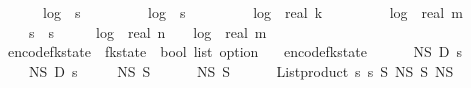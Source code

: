 \begin{isabellebody}
\ \ \ \ {}\ {\isacharasterisk}{\kern0pt}\ log\ {}\ {\isacharparenleft}{\kern0pt}s\ {\isacharplus}{\kern0pt}\ {}{\isacharparenright}{\kern0pt}\ {\isacharplus}{\kern0pt}\isanewline
\ \ \ \ {}\ {\isacharasterisk}{\kern0pt}\ log\ {}\ {\isacharparenleft}{\kern0pt}s\ {\isacharplus}{\kern0pt}\ {}{\isacharparenright}{\kern0pt}\ {\isacharplus}{\kern0pt}\isanewline
\ \ \ \ {}\ {\isacharasterisk}{\kern0pt}\ log\ {}\ {\isacharparenleft}{\kern0pt}real\ k\ {\isacharplus}{\kern0pt}\ {}{\isacharparenright}{\kern0pt}\ {\isacharplus}{\kern0pt}\isanewline
\ \ \ \ {}\ {\isacharasterisk}{\kern0pt}\ log\ {}\ {\isacharparenleft}{\kern0pt}real\ m\ {\isacharplus}{\kern0pt}\ {}{\isacharparenright}{\kern0pt}\ {\isacharplus}{\kern0pt}\isanewline
\ \ \ \ s\ {\isacharasterisk}{\kern0pt}\ s\ {\isacharasterisk}{\kern0pt}\ {\isacharparenleft}{\kern0pt}{}\ {\isacharplus}{\kern0pt}\ {}\ {\isacharasterisk}{\kern0pt}\ log\ {}\ {\isacharparenleft}{\kern0pt}real\ n{\isacharplus}{\kern0pt}{}{\isacharparenright}{\kern0pt}\ {\isacharplus}{\kern0pt}\ {}\ {\isacharasterisk}{\kern0pt}\ log\ {}\ {\isacharparenleft}{\kern0pt}real\ m{\isacharplus}{\kern0pt}{}{\isacharparenright}{\kern0pt}{\isacharparenright}{\kern0pt}{\isacharparenright}{\kern0pt}{\isachardoublequoteclose}\isanewline
\isanewline
{}\isamarkupfalse%
\ encode{\isacharunderscore}{\kern0pt}fk{\isacharunderscore}{\kern0pt}state\ {\isacharcolon}{\kern0pt}{\isacharcolon}{\kern0pt}\ {\isachardoublequoteopen}fk{\isacharunderscore}{\kern0pt}state\ {\isasymRightarrow}\ bool\ list\ option{\isachardoublequoteclose}\ \isanewline
\ \ {\isachardoublequoteopen}encode{\isacharunderscore}{\kern0pt}fk{\isacharunderscore}{\kern0pt}state\ {\isacharequal}{\kern0pt}\ \isanewline
\ \ \ \ N\isactrlsub S\ {\isasymtimes}\isactrlsub D\ {\isacharparenleft}{\kern0pt}{\isasymlambda}s\ \isanewline
\ \ \ \ N\isactrlsub S\ {\isasymtimes}\isactrlsub D\ {\isacharparenleft}{\kern0pt}{\isasymlambda}s\ \isanewline
\ \ \ \ N\isactrlsub S\ {\isasymtimes}\isactrlsub S\ \ \isanewline
\ \ \ \ N\isactrlsub S\ {\isasymtimes}\isactrlsub S\ \ \isanewline
\ \ \ \ {\isacharparenleft}{\kern0pt}List{\isachardot}{\kern0pt}product\ {\isacharbrackleft}{\kern0pt}{}{\isachardot}{\kern0pt}{\isachardot}{\kern0pt}{\isacharless}{\kern0pt}s\ {\isacharbrackleft}{\kern0pt}{}{\isachardot}{\kern0pt}{\isachardot}{\kern0pt}{\isacharless}{\kern0pt}s\ {\isasymrightarrow}\isactrlsub S\ {\isacharparenleft}{\kern0pt}N\isactrlsub S\ {\isasymtimes}\isactrlsub S\ N\isactrlsub S{\isacharparenright}{\kern0pt}{\isacharparenright}{\kern0pt}{\isacharparenright}{\kern0pt}{\isacharparenright}{\kern0pt}{\isachardoublequoteclose}\isanewline

\end{isabellebody}
